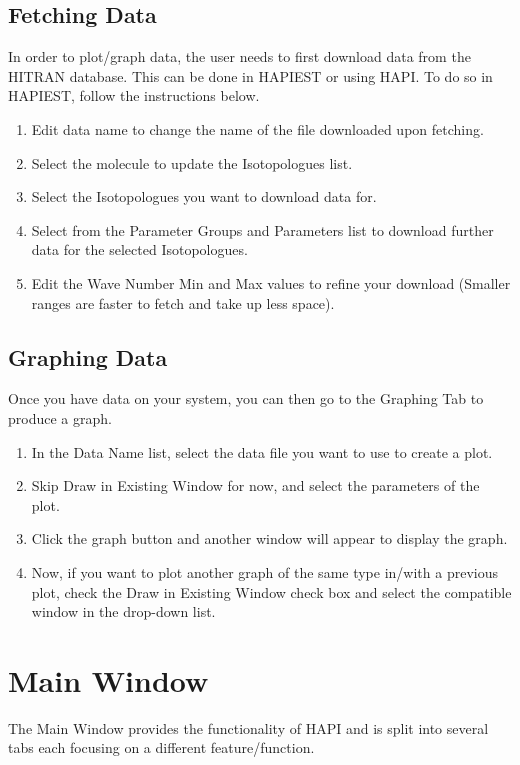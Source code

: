 \documentclass[12pt]{article}
\begin{document}
\subsection{Fetching Data}
In order to plot/graph data, the user needs to first download data from the HITRAN database. This can be done in HAPIEST or using HAPI. To do so in HAPIEST, follow the instructions below.
\begin{enumerate}
\item Edit data name to change the name of the file downloaded upon fetching.
\item Select the molecule to update the Isotopologues list.
\item Select the Isotopologues you want to download data for.
\item Select from the Parameter Groups and Parameters list to download further data for the selected Isotopologues.
\item Edit the Wave Number Min and Max values to refine your download (Smaller ranges are faster to fetch and take up less space).
\end{enumerate}

\subsection{Graphing Data}
Once you have data on your system, you can then go to the Graphing Tab to produce a graph. 
\begin{enumerate}
\item In the Data Name list, select the data file you want to use to create a plot.
\item Skip Draw in Existing Window for now, and select the parameters of the plot.
\item Click the graph button and another window will appear to display the graph.
\item Now, if you want to plot another graph of the same type in/with a previous plot, check the Draw in Existing Window check box and select the compatible window in the drop-down list.
\end{enumerate}

\section{Main Window}
The Main Window provides the functionality of HAPI and is split into several tabs each focusing on a different feature/function. 
\end{document}
